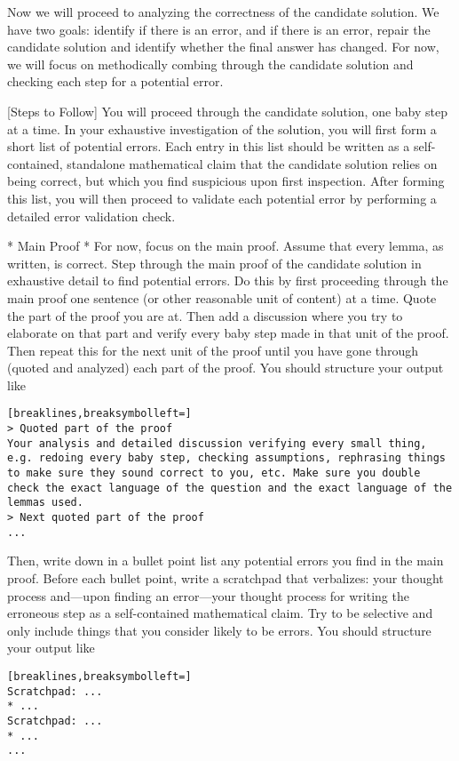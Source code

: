 \begin{tcolorbox}[breakable,title=Verification Prompt 5]
Now we will proceed to analyzing the correctness of the candidate solution. We have two goals: identify if there is an error, and if there is an error, repair the candidate solution and identify whether the final answer has changed. For now, we will focus on methodically combing through the candidate solution and checking each step for a potential error.

[Steps to Follow]
You will proceed through the candidate solution, one baby step at a time. In your exhaustive investigation of the solution, you will first form a short list of potential errors. Each entry in this list should be written as a self-contained, standalone mathematical claim that the candidate solution relies on being correct, but which you find suspicious upon first inspection. After forming this list, you will then proceed to validate each potential error by performing a detailed error validation check.

* Main Proof *
For now, focus on the main proof. Assume that every lemma, as written, is correct. Step through the main proof of the candidate solution in exhaustive detail to find potential errors.
Do this by first proceeding through the main proof one sentence (or other reasonable unit of content) at a time. Quote the part of the proof you are at. Then add a discussion where you try to elaborate on that part and verify every baby step made in that unit of the proof. Then repeat this for the next unit of the proof until you have gone through (quoted and analyzed) each part of the proof. You should structure your output like
\begin{Verbatim}[breaklines,breaksymbolleft=]
> Quoted part of the proof
Your analysis and detailed discussion verifying every small thing, e.g. redoing every baby step, checking assumptions, rephrasing things to make sure they sound correct to you, etc. Make sure you double check the exact language of the question and the exact language of the lemmas used.
> Next quoted part of the proof
...
\end{Verbatim}

Then, write down in a bullet point list any potential errors you find in the main proof. Before each bullet point, write a scratchpad that verbalizes: your thought process and---upon finding an error---your thought process for writing the erroneous step as a self-contained mathematical claim. Try to be selective and only include things that you consider likely to be errors.
You should structure your output like
\begin{Verbatim}[breaklines,breaksymbolleft=]
Scratchpad: ...
* ...
Scratchpad: ...
* ...
...
\end{Verbatim}
\end{tcolorbox}


